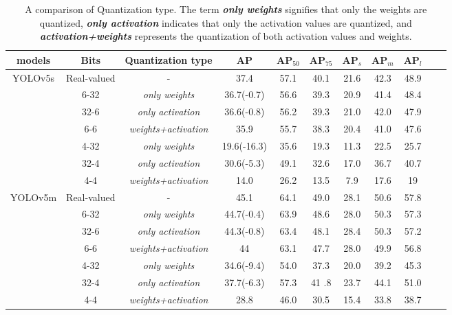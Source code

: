 \documentclass[runningheads]{llncs}
\begin{document}
\begin{table}[!t]
\centering
\caption{A comparison of Quantization type. The term \textbf{\textit{only weights}} signifies that only the weights are quantized, \textbf{\textit{only activation}} indicates that only the activation values are quantized, and \textbf{\textit{activation+weights}} represents the quantization of both activation values and weights.}
\footnotesize
\begin{tabular}{ccccccccccc}
\hline
models                   & Bits                 & Quantization type  & AP   & AP$_{50}$  & AP$_{75}$  & AP$_{s}$  & AP$_{m}$  & AP$_{l}$  \\ \hline
\multirow{7}{*}{YOLOv5s\cite{yolov5}} & Real-valued          & -                  & 37.4        & 57.1 & 40.1  & 21.6 & 42.3 & 48.9 \\ \cline{2-9} 
                         & {6-32} & \textit{only weights}       & 36.7(-0.7)  & 56.6 & 39.3  & 20.9 & 41.4 & 48.4 \\
                         & {32-6} & \textit{only activation}    & 36.6(-0.8)  & 56.2 & 39.3  & 21.0 & 42.0 & 47.9 \\
                         & {6-6} & \textit{weights+activation} & 35.9        & 55.7 & 38.3  & 20.4 & 41.0 & 47.6 \\ \cline{2-9} 
                         & {4-32} & \textit{only weights}       & 19.6(-16.3) & 35.6 & 19.3  & 11.3 & 22.5 & 25.7 \\
                         & {32-4} & \textit{only activation}    & 30.6(-5.3)  & 49.1 & 32.6  & 17.0 & 36.7 & 40.7 \\
                         & {4-4} & \textit{weights+activation} & 14.0        & 26.2 & 13.5  & 7.9  & 17.6 & 19   \\ \hline
\multirow{7}{*}{YOLOv5m\cite{yolov5}} & Real-valued          & -                  & 45.1        & 64.1 & 49.0  & 28.1 & 50.6 & 57.8 \\ \cline{2-9} 
                         & {6-32} & \textit{only weights}       & 44.7(-0.4)  & 63.9 & 48.6  & 28.0 & 50.3 & 57.3 \\
                         & {32-6} & \textit{only activation}    & 44.3(-0.8)  & 63.4 & 48.1  & 28.4 & 50.3 & 57.2 \\
                         & {6-6}  & \textit{weights+activation} & 44          & 63.1 & 47.7  & 28.0 & 49.9 & 56.8 \\ \cline{2-9} 
                         & {4-32} & \textit{only weights}       & 34.6(-9.4)  & 54.0 & 37.3  & 20.0 & 39.2 & 45.3 \\
                         & {32-4} & \textit{only activation}    & 37.7(-6.3)  & 57.3 & 41 .8 & 23.7 & 44.1 & 51.0 \\
                         & {4-4}  & \textit{weights+activation} & 28.8        & 46.0 & 30.5  & 15.4 & 33.8 & 38.7 \\ \hline
\end{tabular}
\label{exp_mode}
\end{table}
\end{document}
